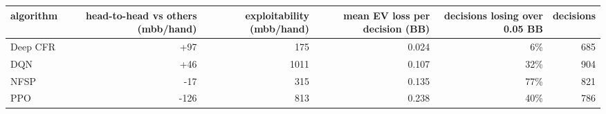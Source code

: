 \begin{tabular}{lrrrrr}
\toprule
algorithm & head-to-head vs others (mbb/hand) & exploitability (mbb/hand) & mean EV loss per decision (BB) & decisions losing over 0.05 BB & decisions \\
\midrule
Deep CFR & +97 & 175 & 0.024 & 6\% & 685 \\
DQN & +46 & 1011 & 0.107 & 32\% & 904 \\
NFSP & -17 & 315 & 0.135 & 77\% & 821 \\
PPO & -126 & 813 & 0.238 & 40\% & 786 \\
\bottomrule
\end{tabular}
